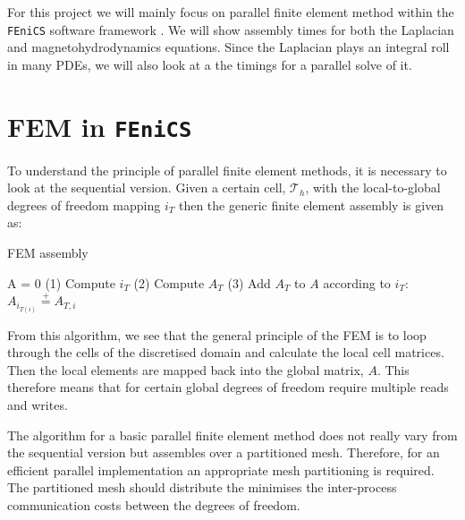 \documentclass[10pt]{article}
\newcommand{\fenics}{{\tt FEniCS} }
\begin{document}
For this project we will mainly focus on parallel finite element method within the \fenics  software framework \cite{wells2012automated}. We will show assembly times for both the Laplacian and magnetohydrodynamics equations. Since the Laplacian plays an integral roll in many PDEs, we will also look at a the timings for a parallel solve of it.


\section{FEM in \fenics}

To understand the principle of parallel finite element methods, it is necessary to look at the sequential version. Given a certain cell, $\mathcal{T}_h$, with the local-to-global degrees of freedom mapping $i_T$ then the generic finite element assembly is given as:
\begin{algorithm}

FEM assembly
    \begin{algorithmic}[1]
    \State A = 0
        \State (1) Compute $i_T$
        \State (2) Compute $A_T$
        \State (3) Add $A_T$ to $A$ according to $i_T$:
            \State $ A_{i_{T(i)}} \stackrel{+}{=} A_{T,i}$
        \EndFor
    \EndFor
    \end{algorithmic}
\end{algorithm}

From this algorithm, we see that the general principle of the FEM is to loop through the cells of the discretised domain and calculate the local cell matrices. Then the local elements are mapped back into the global matrix, $A$. This therefore means that for certain global degrees of freedom require multiple reads and writes.

The algorithm for a basic parallel finite element method does not really vary from the sequential version but assembles over a partitioned mesh. Therefore, for an efficient parallel implementation an appropriate mesh partitioning is required. The partitioned mesh should distribute the minimises the inter-process communication costs between the degrees of freedom.


\end{document}

